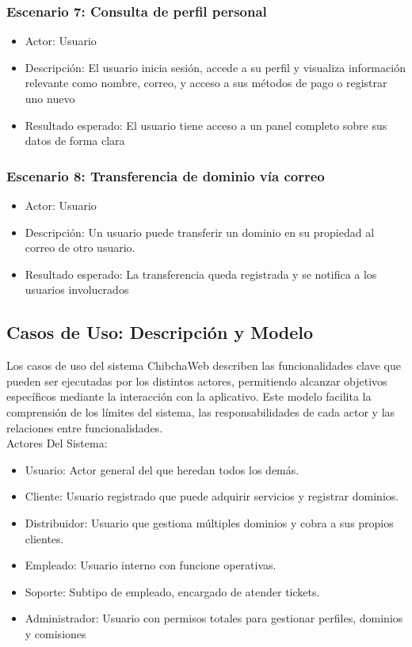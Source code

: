 \subsubsection{Escenario 7: Consulta de perfil personal}

\begin{itemize}
\item Actor: Usuario

\item Descripción: El usuario inicia sesión, accede a su perfil y visualiza información relevante como nombre, correo, y acceso a sus métodos de pago o registrar uno nuevo

\item Resultado esperado: El usuario tiene acceso a un panel completo sobre sus datos de forma clara
\end{itemize}

\subsubsection{Escenario 8: Transferencia de dominio vía correo}

\begin{itemize}
\item Actor: Usuario

\item Descripción: Un usuario puede transferir un dominio en su propiedad al correo de otro usuario.

\item Resultado esperado: La transferencia queda registrada y se notifica a los usuarios involucrados
\end{itemize}

\subsection{Casos de Uso: Descripción y Modelo}

Los casos de uso del sistema ChibchaWeb describen las funcionalidades clave que pueden ser ejecutadas por los distintos actores, permitiendo alcanzar objetivos específicos mediante la interacción con la aplicativo. Este modelo facilita la comprensión de los límites del sistema, las responsabilidades de cada actor y las relaciones entre funcionalidades.\\

Actores Del Sistema:
\begin{itemize}
    \item Usuario: Actor general del que heredan todos los demás.
    \item Cliente: Usuario registrado que puede adquirir servicios y registrar dominios.
    \item Distribuidor: Usuario que gestiona múltiples dominios y cobra a sus propios clientes.
    \item Empleado: Usuario interno con funcione operativas.
    \item Soporte: Subtipo de empleado, encargado de atender tickets.
    \item Administrador: Usuario con permisos totales para gestionar perfiles, dominios y comisiones
\end{itemize}

